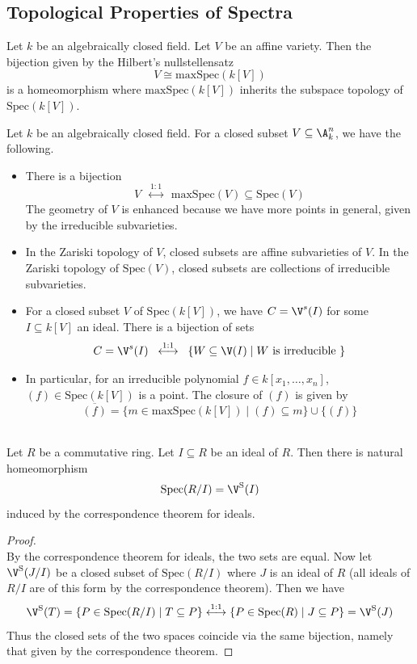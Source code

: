 \documentclass[a4paper]{article}
\begin{document}
\subsection{Topological Properties of Spectra}
\begin{lmm}{}{} Let $k$ be an algebraically closed field. Let $V$ be an affine variety. Then the bijection given by the Hilbert's nullstellensatz $$V\cong\text{maxSpec}(k[V])$$ is a homeomorphism where $\text{maxSpec}(k[V])$ inherits the subspace topology of $\text{Spec}(k[V])$. 
\end{lmm}

Let $k$ be an algebraically closed field. For a closed subset $V\subseteq\A_k^n$, we have the following. 

\begin{itemize}
\item There is a bijection $$V\;\;\overset{1:1}{\longleftrightarrow}\;\;\text{maxSpec}(V)\subseteq\text{Spec}(V)$$ The geometry of $V$ is enhanced because we have more points in general, given by the irreducible subvarieties. 
\item In the Zariski topology of $V$, closed subsets are affine subvarieties of $V$. In the Zariski topology of $\text{Spec}(V)$, closed subsets are collections of irreducible subvarieties. 
\item For a closed subset $V$ of $\text{Spec}(k[V])$, we have $C=\V^s(I)$ for some $I\subseteq k[V]$ an ideal. There is a bijection of sets $$C=\V^s(I)\;\;\overset{1:1}{\longleftrightarrow}\;\;\{W\subseteq\V(I)\;|\;W\text{ is irreducible }\}$$
\item In particular, for an irreducible polynomial $f\in k[x_1,\dots,x_n]$, $(f)\in\text{Spec}(k[V])$ is a point. The closure of $(f)$ is given by $$\overline{(f)}=\{m\in\text{maxSpec}(k[V])\;|\;(f)\subseteq m\}\cup\{(f)\}$$
\end{itemize}

\begin{prp}{}{}\\
Let $R$ be a commutative ring. Let $I\subseteq R$ be an ideal of $R$. Then there is natural homeomorphism $$\text{Spec}(R/I)=\V^\text{S}(I)$$ induced by the correspondence theorem for ideals. 
\begin{proof}\\
By the correspondence theorem for ideals, the two sets are equal. Now let $\V^\text{S}(J/I)$ be a closed subset of $\text{Spec}(R/I)$ where $J$ is an ideal of $R$ (all ideals of $R/I$ are of this form by the correspondence theorem). Then we have $$\V^\text{S}(T)=\{P\in\text{Spec}(R/I)\;|\;T\subseteq P\}\overset{1:1}{\longleftrightarrow}\{P\in\text{Spec}(R)\;|\;J\subseteq P\}=\V^\text{S}(J)$$ Thus the closed sets of the two spaces coincide via the same bijection, namely that given by the correspondence theorem. 
\end{proof}
\end{prp}
\end{document}
